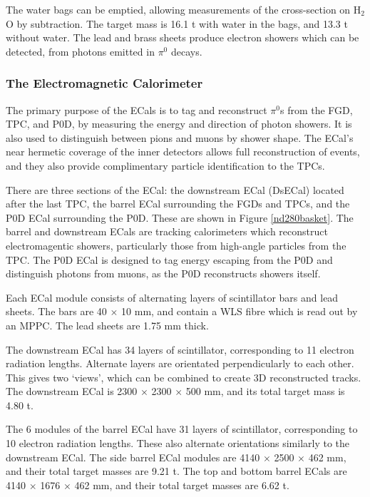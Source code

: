 The water bags can be emptied, allowing measurements of the cross-section on H$_2$O by subtraction. The target mass is 16.1 t with water in the bags, and 13.3 t without water. The lead and brass sheets produce electron showers which can be detected, from photons emitted in $\pi^0$ decays.

\subsubsection{The Electromagnetic Calorimeter}\label{sec:ecal}

The primary purpose of the ECals is to tag and reconstruct $\pi^0$s from the FGD, TPC, and P0D, by measuring the energy and direction of photon showers. It is also used to distinguish between pions and muons by shower shape. The ECal's near hermetic coverage of the inner detectors allows full reconstruction of events, and they also provide complimentary particle identification to the TPCs.

There are three sections of the ECal: the downstream ECal (DsECal) located after the last TPC, the barrel ECal surrounding the FGDs and TPCs, and the P0D ECal surrounding the P0D. These are shown in Figure \ref{nd280basket}. The barrel and downstream ECals are tracking calorimeters which reconstruct electromagentic showers, particularly those from high-angle particles from the TPC. The P0D ECal is designed to tag energy escaping from the P0D and distinguish photons from muons, as the P0D reconstructs showers itself.

Each ECal module consists of alternating layers of scintillator bars and lead sheets. The bars are 40 $\times$ 10 mm, and contain a WLS fibre which is read out by an MPPC. The lead sheets are 1.75 mm thick.

The downstream ECal has 34 layers of scintillator, corresponding to 11 electron radiation lengths. Alternate layers are orientated perpendicularly to each other. This gives two `views', which can be combined to create 3D reconstructed tracks. The downstream ECal is 2300 $\times$ 2300 $\times$ 500 mm, and its total target mass is 4.80 t.

The 6 modules of the barrel ECal have 31 layers of scintillator, corresponding to 10 electron radiation lengths. These also alternate orientations similarly to the downstream ECal. The side barrel ECal modules are 4140 $\times$ 2500 $\times$ 462 mm, and their total target masses are 9.21 t. The top and bottom barrel ECals are 4140 $\times$ 1676 $\times$ 462 mm, and their total target masses are 6.62 t.

